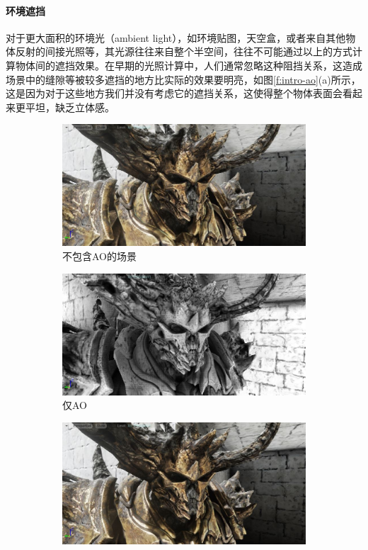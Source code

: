 \paragraph{环境遮挡}
对于更大面积的环境光（ambient light），如环境贴图，天空盒，或者来自其他物体反射的间接光照等，其光源往往来自整个半空间，往往不可能通过以上的方式计算物体间的遮挡效果。在早期的光照计算中，人们通常忽略这种阻挡关系，这造成场景中的缝隙等被较多遮挡的地方比实际的效果要明亮，如图\ref{f:intro-ao}(a)所示，这是因为对于这些地方我们并没有考虑它的遮挡关系，这使得整个物体表面会看起来更平坦，缺乏立体感。

\begin{figure}
\begin{fullwidth}
	\begin{subfigure}[b]{0.325\thewidth}
		\includegraphics[width=1.\textwidth]{figures/intro/ao-1}
		\caption{不包含AO的场景}
	\end{subfigure}
	\begin{subfigure}[b]{0.325\thewidth}
		\includegraphics[width=1.\textwidth]{figures/intro/ao-2}
		\caption{仅AO}
	\end{subfigure}
	\begin{subfigure}[b]{0.325\thewidth}
		\includegraphics[width=1.\textwidth]{figures/intro/ao-3}

\end{subfigure}
\end{fullwidth}
\end{figure}
